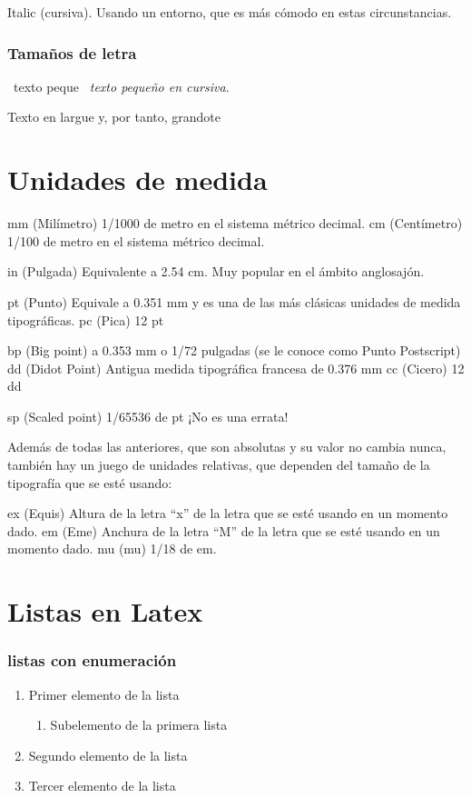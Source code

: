 \documentclass[a4paper,11pt]{article}
\begin{document}
\begin{em}
Italic (cursiva). Usando un entorno, que es más cómodo en estas circunstancias.
\end{em}

\section{Tamaños de letra}
\begin{rm}
\scriptsize\ texto peque
\itshape\ texto pequeño en cursiva.
\end{rm}

\begin{Large}

Texto en largue y, por tanto, grandote

\end{Large}

\part{Unidades de medida}

mm (Milímetro) 1/1000 de metro en el sistema métrico decimal.
cm (Centímetro) 1/100 de metro en el sistema métrico decimal.

in (Pulgada) Equivalente a 2.54 cm. Muy popular en el ámbito anglosajón.

pt (Punto) Equivale a 0.351 mm y es una de las más clásicas unidades de medida tipográficas.
pc (Pica) 12 pt

bp (Big point) a 0.353 mm o 1/72 pulgadas (se le conoce como Punto Postscript)
dd (Didot Point) Antigua medida tipográfica francesa de 0.376 mm
cc (Cicero) 12 dd

sp (Scaled point) 1/65536 de pt ¡No es una errata!

Además de todas las anteriores, que son absolutas y su valor no cambia nunca, también hay un juego de unidades relativas, que dependen del tamaño de la tipografía que se esté usando:

ex (Equis) Altura de la letra “x” de la letra que se esté usando en un momento dado.
em (Eme) Anchura de la letra “M” de la letra que se esté usando en un momento dado.
mu (mu) 1/18 de em.

\part{Listas en Latex}
\section{listas con enumeración}
\begin{enumerate}
 \item Primer elemento de la lista
 \begin{enumerate}
   \item Subelemento de la primera lista
 \end{enumerate}
 \item Segundo elemento de la lista
 \item Tercer elemento de la lista
\end{enumerate}
\end{document}
